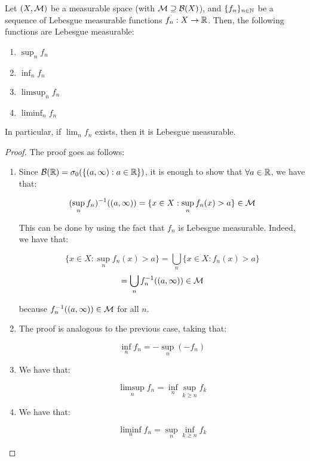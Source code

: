 \begin{fproposition}
    Let $(X, \mathcal{M})$ be a measurable space (with $\mathcal{M} \supseteq \mathcal{B}(X)$), and
    $\{f_n\}_{n \in \mathbb{N}}$ be a sequence of Lebesgue measurable functions $f_n: X \to \mathbb{R}$.
    Then, the following functions are Lebesgue measurable:

    \vspace{1em}

    \begin{enumerate}
        \item $\sup_{n} f_n$
        \vspace{1em}
        \item $\inf_{n} f_n$
        \vspace{1em}
        \item $\limsup_{n} f_n$
        \vspace{1em}
        \item $\liminf_{n} f_n$
    \end{enumerate}

    In particular, if $\lim_{n} f_n$ exists, then it is Lebesgue measurable.

\end{fproposition}

\begin{proof}
    The proof goes as follows:

    \begin{enumerate}
        \item Since $\mathcal{B}(\mathbb{R}) = \sigma_0(\{(a, \infty): a \in \mathbb{R}\})$, it is enough to show that
        $\forall a \in \mathbb{R}$, we have that:

        $$(\sup_{n} f_n)^{-1}((a, \infty))= \{x \in X: \sup_{n} f_n(x) > a\} \in \mathcal{M}$$
    
        This can be done by using the fact that $f_n$ is Lebesgue measurable. 
        Indeed, we have that:
        
        $$\{x \in X: \sup_{n} f_n(x) > a\} = \bigcup_{n} \{x \in X: f_n(x) > a\} $$
        $$ = \bigcup_{n} f_n^{-1}((a, \infty)) \in \mathcal{M}$$

        because $f_n^{-1}((a, \infty)) \in \mathcal{M}$ for all $n$.
    
        \item The proof is analogous to the previous case, taking that:
        
        $$\inf_{n} f_n = -\sup_{n} (-f_n)$$

        \item We have that:
        
        $$\limsup_{n} f_n = \inf_{n} \sup_{k \geq n} f_k$$

        \item We have that:
        
        $$\liminf_{n} f_n = \sup_{n} \inf_{k \geq n} f_k$$

    \end{enumerate}
\end{proof}

